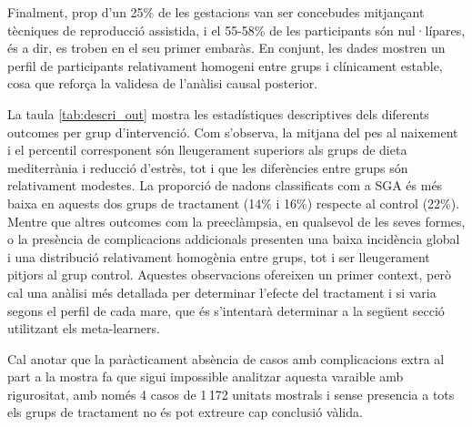 \documentclass[../main.tex]{subfiles}
\begin{document}
    Finalment, prop d’un 25\% de les gestacions van ser concebudes mitjançant tècniques de reproducció assistida, i el 55-58\% de les participants són nul·lípares, és a dir, es troben en el seu primer embaràs. En conjunt, les dades mostren un perfil de participants relativament homogeni entre grups i clínicament estable, cosa que reforça la validesa de l’anàlisi causal posterior.\par

    La taula \ref{tab:descri_out} mostra les estadístiques descriptives dels diferents outcomes per grup d’intervenció. Com s’observa, la mitjana del pes al naixement i el percentil corresponent són lleugerament superiors als grups de dieta mediterrània i reducció d'estrès, tot i que les diferències entre grups són relativament modestes. La proporció de nadons classificats com a SGA és més baixa en aquests dos grups de tractament (14\% i 16\%)  respecte al control (22\%). Mentre que altres outcomes com la preeclàmpsia, en qualsevol de les seves formes, o la presència de complicacions addicionals presenten una baixa incidència global i una distribució relativament homogènia entre grups, tot i ser lleugerament pitjors al grup control. Aquestes observacions ofereixen un primer context, però cal una anàlisi més detallada per determinar l’efecte del tractament i si varia segons el perfil de cada mare, que és s'intentarà determinar a la següent secció utilitzant els meta-learners.\par
    Cal anotar que la paràcticament absència de casos amb complicacions extra al part a la mostra fa que sigui impossible analitzar aquesta varaible amb rigurositat, amb només 4 casos de 1\,172 unitats mostrals i sense presencia a tots els grups de tractament no és pot extreure cap conclusió vàlida.
    
\end{document}
